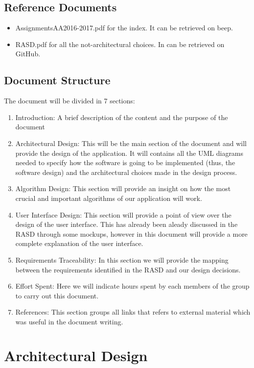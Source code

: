 \documentclass[english]{article}
\begin{document}
	\subsection{Reference Documents}
		\begin{itemize}
			\item{AssignmentsAA2016-2017.pdf for the index. It can be retrieved on beep.}
			\item{RASD.pdf for all the not-architectural choices. In can be retrieved on GitHub.}
		\end{itemize}
	\subsection{Document Structure}
		The document will be divided in 7 sections:
			\begin{enumerate}
				\item{Introduction: A brief description of the content and the purpose of the document}
				\item{Architectural Design: This will be the main section of the document and will provide the design of the application. It will contains all the UML diagrams needed to specify how the software is going to be implemented (thus, the software design) and the architectural choices made in the design process.}
				\item{Algorithm Design: This section will provide an insight on how the most crucial and important algorithms of our application will work.}
				\item{User Interface Design: This section will provide a point of view over the design of the user interface. This has already been aleady discussed in the RASD through some mockups, however in this document will provide a more complete explanation of the user interface.}
				\item{Requirements Traceability: In this section we will provide the mapping between the requirements identified in the RASD and our design decisions.}
				\item{Effort Spent: Here we will indicate hours spent by each members of the group to carry out this document.}
				\item{References: This section groups all links that refers to external material which was useful in the document writing.}
			\end{enumerate}
\section{Architectural Design}
\end{document}

